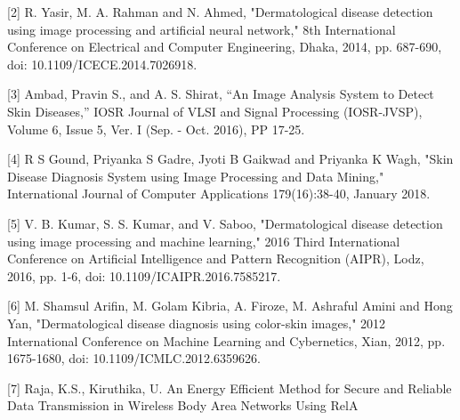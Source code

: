 \documentclass{article}
\begin{document}
[2] R. Yasir, M. A. Rahman and N. Ahmed, "Dermatological disease detection using image processing and artificial neural network," 8th International Conference on Electrical and Computer Engineering, Dhaka, 2014, pp. 687-690, doi: 10.1109/ICECE.2014.7026918.



[3] Ambad, Pravin S., and A. S. Shirat, “An Image Analysis System to Detect Skin Diseases,” IOSR Journal of VLSI and Signal Processing (IOSR-JVSP), Volume 6, Issue 5, Ver. I (Sep. - Oct. 2016), PP 17-25.



[4] R S Gound, Priyanka S Gadre, Jyoti B Gaikwad and Priyanka K Wagh, "Skin Disease Diagnosis System using Image Processing and Data Mining," International Journal of Computer Applications 179(16):38-40, January 2018.



[5] V. B. Kumar, S. S. Kumar, and V. Saboo, "Dermatological disease detection using image processing and machine learning," 2016 Third International Conference on Artificial Intelligence and Pattern Recognition (AIPR), Lodz, 2016, pp. 1-6, doi: 10.1109/ICAIPR.2016.7585217.


[6] M. Shamsul Arifin, M. Golam Kibria, A. Firoze, M. Ashraful Amini and Hong Yan, "Dermatological disease diagnosis using color-skin images," 2012 International Conference on Machine Learning and Cybernetics, Xian, 2012, pp. 1675-1680, doi: 10.1109/ICMLC.2012.6359626.


[7] Raja, K.S., Kiruthika, U. An Energy Efficient Method for Secure and Reliable Data Transmission in Wireless Body Area Networks Using RelA
\end{document}
